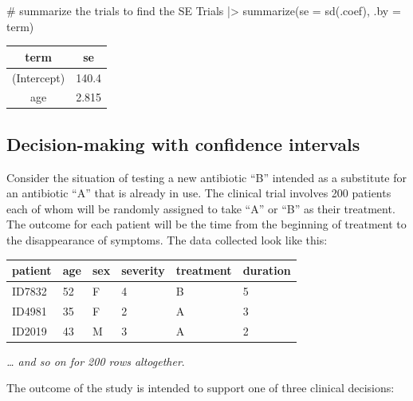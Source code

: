\documentclass[
  letterpaper,
  DIV=11,
  numbers=noendperiod,
  oneside]{scrartcl}
\newenvironment{Shaded}{\begin{snugshade}}{\end{snugshade}}
\newcommand{\AttributeTok}[1]{\textcolor[rgb]{0.40,0.45,0.13}{#1}}
\newcommand{\CommentTok}[1]{\textcolor[rgb]{0.37,0.37,0.37}{#1}}
\newcommand{\FunctionTok}[1]{\textcolor[rgb]{0.28,0.35,0.67}{#1}}
\newcommand{\NormalTok}[1]{\textcolor[rgb]{0.00,0.23,0.31}{#1}}
\newcommand{\SpecialCharTok}[1]{\textcolor[rgb]{0.37,0.37,0.37}{#1}}
\begin{document}
\begin{tcolorbox}
\begin{Shaded}
\begin{Highlighting}[]
\CommentTok{\# summarize the trials to find the SE}
\NormalTok{Trials }\SpecialCharTok{|\textgreater{}} 
  \FunctionTok{summarize}\NormalTok{(}\AttributeTok{se =} \FunctionTok{sd}\NormalTok{(.coef), }\AttributeTok{.by =}\NormalTok{ term)}
\end{Highlighting}
\end{Shaded}

\begin{longtable}[]{@{}cc@{}}
\toprule\noalign{}
term & se \\
\midrule\noalign{}
\endhead
\bottomrule\noalign{}
\endlastfoot
(Intercept) & 140.4 \\
age & 2.815 \\
\end{longtable}

\end{tcolorbox}

\subsection{Decision-making with confidence
intervals}\label{decision-making-with-confidence-intervals}

Consider the situation of testing a new antibiotic ``B'' intended as a
substitute for an antibiotic ``A'' that is already in use. The clinical
trial involves 200 patients each of whom will be randomly assigned to
take ``A'' or ``B'' as their treatment.
{} The outcome for each patient will be
the time from the beginning of treatment to the disappearance of
symptoms. The data collected look like this:

\begin{longtable}[]{@{}llllll@{}}
\toprule\noalign{}
patient & age & sex & severity & treatment & duration \\
\midrule\noalign{}
\endhead
\bottomrule\noalign{}
\endlastfoot
ID7832 & 52 & F & 4 & B & 5 \\
ID4981 & 35 & F & 2 & A & 3 \\
ID2019 & 43 & M & 3 & A & 2 \\
\end{longtable}

\emph{\ldots{} and so on for 200 rows altogether}.

The outcome of the study is intended to support one of three clinical
decisions:
\end{document}
